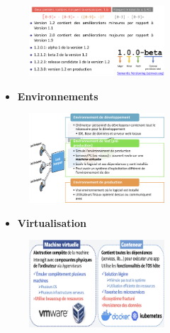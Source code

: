 \documentclass[16pt]{report}
\begin{document}
\begin{multicols*}{2}
    \begin{figure}[H]
        \begin{center}
            \includegraphics[width=0.45\textwidth]{seqvers.png}
        \end{center}
    \end{figure}


    \begin{itemize}
        \item \textbf{Environnements}  
    \end{itemize}


    \begin{figure}[H]
        \begin{center}
            \includegraphics[width=0.45\textwidth]{environnementDevl.png}
        \end{center}
    \end{figure}


    \begin{itemize}
        \item \textbf{Virtualisation}  
    \end{itemize}


    \begin{figure}[H]
        \begin{center}
            \includegraphics[width=0.45\textwidth]{virtualisation.png}
        \end{center}
    \end{figure}


\end{multicols*}
\end{document}
